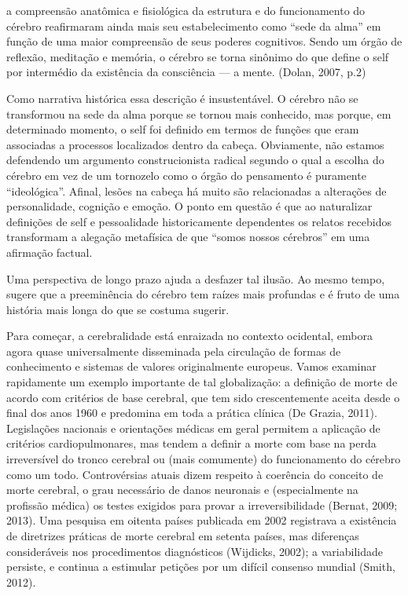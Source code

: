 a compreensão anatômica e fisiológica da estrutura e do funcionamento do
cérebro reafirmaram ainda mais seu estabelecimento como ``sede da alma''
em função de uma maior compreensão de seus poderes cognitivos. Sendo um
órgão de reflexão, meditação e memória, o cérebro se torna sinônimo do
que define o self por intermédio da existência da consciência --- a
mente. (Dolan, 2007, p.2)

Como narrativa histórica essa descrição é insustentável. O cérebro não
se transformou na sede da alma porque se tornou mais conhecido, mas
porque, em determinado momento, o self foi definido em termos de funções
que eram associadas a processos localizados dentro da cabeça.
Obviamente, não estamos defendendo um argumento construcionista radical
segundo o qual a escolha do cérebro em vez de um tornozelo como o órgão
do pensamento é puramente ``ideológica''. Afinal, lesões na cabeça há
muito são relacionadas a alterações de personalidade, cognição e emoção.
O ponto em questão é que ao naturalizar definições de self e
pessoalidade historicamente dependentes os relatos recebidos transformam
a alegação metafísica de que ``somos nossos cérebros'' em uma afirmação
factual.

Uma perspectiva de longo prazo ajuda a desfazer tal ilusão. Ao mesmo
tempo, sugere que a preeminência do cérebro tem raízes mais profundas e
é fruto de uma história mais longa do que se costuma sugerir.

Para começar, a cerebralidade está enraizada no contexto ocidental,
embora agora quase universalmente disseminada pela circulação de formas
de conhecimento e sistemas de valores originalmente europeus. Vamos
examinar rapidamente um exemplo importante de tal globalização: a
definição de morte de acordo com critérios de base cerebral, que tem
sido crescentemente aceita desde o final dos anos 1960 e predomina em
toda a prática clínica (De Grazia, 2011). Legislações nacionais e
orientações médicas em geral permitem a aplicação de critérios
cardiopulmonares, mas tendem a definir a morte com base na perda
irreversível do tronco cerebral ou (mais comumente) do funcionamento do
cérebro como um todo. Controvérsias atuais dizem respeito à coerência do
conceito de morte cerebral, o grau necessário de danos neuronais e
(especialmente na profissão médica) os testes exigidos para provar a
irreversibilidade (Bernat, 2009; 2013). Uma pesquisa em oitenta países
publicada em 2002 registrava a existência de diretrizes práticas de
morte cerebral em setenta países, mas diferenças consideráveis nos
procedimentos diagnósticos (Wijdicks, 2002); a variabilidade persiste, e
continua a estimular petições por um difícil consenso mundial (Smith,
2012).

